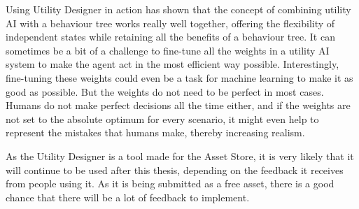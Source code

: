 \newpage

Using Utility Designer in action has shown that the concept of combining utility AI with a behaviour tree works really well together, offering the flexibility of independent states while retaining all the benefits of a behaviour tree. It can sometimes be a bit of a challenge to fine-tune all the weights in a utility AI system to make the agent act in the most efficient way possible. Interestingly, fine-tuning these weights could even be a task for machine learning to make it as good as possible. But the weights do not need to be perfect in most cases. Humans do not make perfect decisions all the time either, and if the weights are not set to the absolute optimum for every scenario, it might even help to represent the mistakes that humans make, thereby increasing realism.

As the Utility Designer is a tool made for the Asset Store, it is very likely that it will continue to be used after this thesis, depending on the feedback it receives from people using it. As it is being submitted as a free asset, there is a good chance that there will be a lot of feedback to implement.